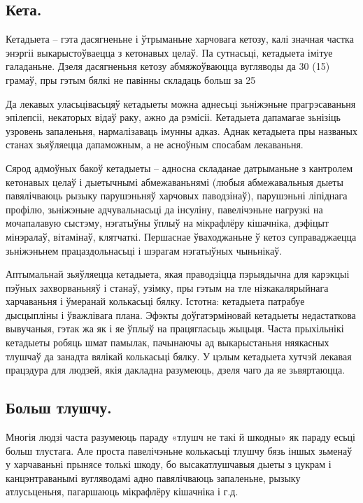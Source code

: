 \subsection{Кета.}
Кетадыета – гэта дасягненьне і ўтрыманьне харчовага кетозу, калі значная частка энэргіі выкарыстоўваецца з кетонавых целаў. Па сутнасьці, кетадыета імітуе галаданьне. Дзеля дасягненьня кетозу абмяжоўваюцца вугляводы да 30 (15) грамаў, пры гэтым бялкі не павінны складаць больш за 25%

Да лекавых уласьцівасьцяў кетадыеты можна аднесьці зьніжэньне прагрэсаваньня эпілепсіі, некаторых відаў раку, ажно да рэмісіі. Кетадыета дапамагае зьнізіць узровень запаленьня, нармалізаваць імунны адказ. Аднак кетадыета пры названых станах зьяўляецца дапаможным, а не асноўным спосабам лекаваньня.

Сярод адмоўных бакоў кетадыеты – адносна складанае датрыманьне з кантролем кетонавых целаў і дыетычнымі абмежаваньнямі (любыя абмежавальныя дыеты павялічваюць рызыку парушэньняў харчовых паводзінаў), парушэньні ліпіднага профілю, зьніжэньне адчувальнасьці да інсуліну, павелічэньне нагрузкі на мочапалавую сыстэму, нэгатыўны ўплыў на мікрафлёру кішачніка, дэфіцыт мінэралаў, вітамінаў, клятчаткі. Першаснае ўваходжаньне ў кетоз суправаджаецца зьніжэньнем працаздольнасьці і шэрагам нэгатыўных чыньнікаў.

Аптымальнай зьяўляецца кетадыета, якая праводзіцца пэрыядычна для карэкцыі пэўных захворваньняў і станаў, узімку, пры гэтым на тле нізкакалярыйнага харчаваньня і ўмеранай колькасьці бялку. Істотна: кетадыета патрабуе дысцыпліны і ўважлівага плана. Эфэкты доўгатэрміновай кетадыеты недастаткова вывучаныя, гэтак жа як і яе ўплыў на працягласьць жыцьця. Часта прыхільнікі кетадыеты робяць шмат памылак, пачынаючы ад выкарыстаньня няякасных тлушчаў да занадта вялікай колькасьці бялку. У цэлым кетадыета хутчэй лекавая працэдура для людзей, якія дакладна разумеюць, дзеля чаго да яе зьвяртаюцца.

\subsection{Больш тлушчу.}
Многія людзі часта разумеюць параду «тлушч не такі й шкодны» як параду есьці больш тлустага. Але проста павелічэньне колькасьці тлушчу бязь іншых зьменаў у харчаваньні прынясе толькі шкоду, бо высакатлушчавыя дыеты з цукрам і канцэнтраванымі вугляводамі адно павялічваюць запаленьне, рызыку атлусьценьня, пагаршаюць мікрафлёру кішачніка і г.д.

